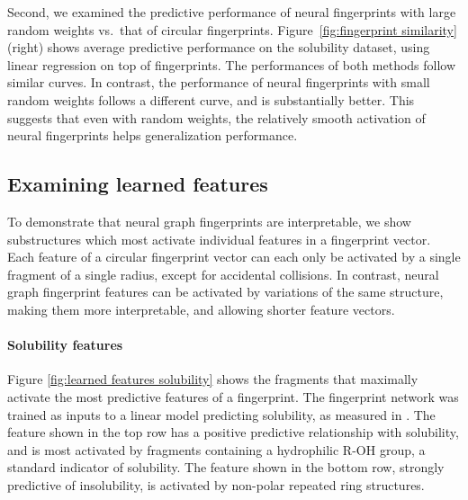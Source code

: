 \documentclass{article}
\newcommand{\citep}{\cite}
\begin{document}
Second, we examined the predictive performance of neural fingerprints with large random weights vs.\ that of  circular fingerprints.
Figure~\ref{fig:fingerprint similarity} (right) shows average predictive performance on the solubility dataset, using linear regression on top of fingerprints.
The performances of both methods follow similar curves. %
In contrast, the performance of neural fingerprints with small random weights follows a different curve, and is substantially better.
This suggests that even with random weights, the relatively smooth activation of neural fingerprints helps generalization performance.%

\subsection{Examining learned features}
To demonstrate that neural graph fingerprints are interpretable, we show substructures which most activate individual features in a fingerprint vector.
Each feature of a circular fingerprint vector can each only be activated by a single fragment of a single radius, except for accidental collisions.
In contrast, neural graph fingerprint features can be activated by variations of the same structure, making them more interpretable, and allowing shorter feature vectors.

\paragraph{Solubility features}
Figure \ref{fig:learned features solubility} shows the fragments that maximally activate the most predictive features of a fingerprint.
The fingerprint network was trained as inputs to a linear model predicting solubility, as measured in \citep{delaney_data_2004}.
The feature shown in the top row has a positive predictive relationship with solubility, and is most activated by fragments containing a hydrophilic R-OH group, a standard indicator of solubility.
The feature shown in the bottom row, strongly predictive of insolubility, is activated by non-polar repeated ring structures.
\end{document}
